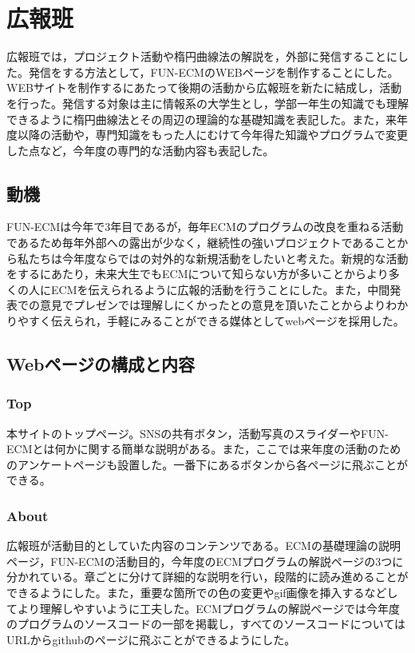 \documentclass[openany,11pt,papersize]{jsbook}
\begin{document}

\section{広報班}
広報班では，プロジェクト活動や楕円曲線法の解説を，外部に発信することにした。発信をする方法として，FUN-ECMのWEBページを制作することにした。WEBサイトを制作するにあたって後期の活動から広報班を新たに結成し，活動を行った。発信する対象は主に情報系の大学生とし，学部一年生の知識でも理解できるように楕円曲線法とその周辺の理論的な基礎知識を表記した。また，来年度以降の活動や，専門知識をもった人にむけて今年得た知識やプログラムで変更した点など，今年度の専門的な活動内容も表記した。

\subsection{動機}
FUN-ECMは今年で3年目であるが，毎年ECMのプログラムの改良を重ねる活動であるため毎年外部への露出が少なく，継続性の強いプロジェクトであることから私たちは今年度ならではの対外的な新規活動をしたいと考えた。新規的な活動をするにあたり，未来大生でもECMについて知らない方が多いことからより多くの人にECMを伝えられるように広報的活動を行うことにした。また，中間発表での意見でプレゼンでは理解しにくかったとの意見を頂いたことからよりわかりやすく伝えられ，手軽にみることができる媒体としてwebページを採用した。


\subsection{Webページの構成と内容}
\subsubsection{Top}
本サイトのトップページ。SNSの共有ボタン，活動写真のスライダーやFUN-ECMとは何かに関する簡単な説明がある。また，ここでは来年度の活動のためのアンケートページも設置した。一番下にあるボタンから各ページに飛ぶことができる。


\subsubsection{About}
広報班が活動目的としていた内容のコンテンツである。ECMの基礎理論の説明ページ，FUN-ECMの活動目的，今年度のECMプログラムの解説ページの3つに分かれている。章ごとに分けて詳細的な説明を行い，段階的に読み進めることができるようにした。また，重要な箇所での色の変更やgif画像を挿入するなどしてより理解しやすいように工夫した。ECMプログラムの解説ページでは今年度のプログラムのソースコードの一部を掲載し，すべてのソースコードについてはURLからgithubのページに飛ぶことができるようにした。
\end{document}
